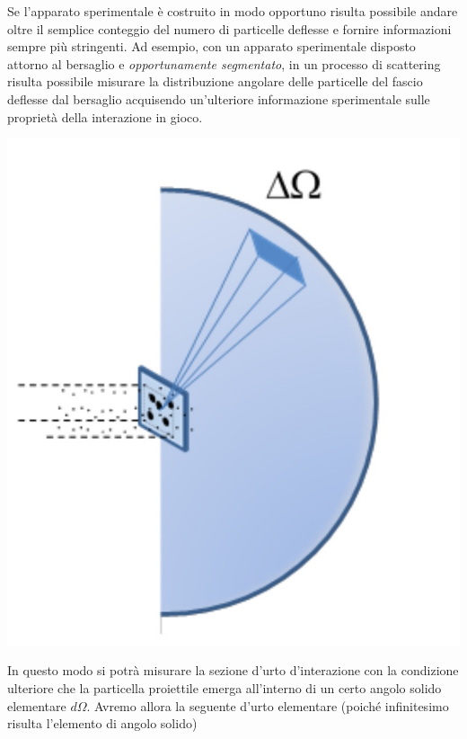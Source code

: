 Se l'apparato sperimentale è costruito in modo opportuno risulta
possibile andare oltre il semplice conteggio del numero di particelle
deflesse e fornire informazioni sempre più stringenti.
Ad esempio, con un apparato sperimentale disposto attorno al bersaglio e
\emph{opportunamente segmentato}, in un processo di scattering risulta
possibile misurare la distribuzione angolare delle particelle del fascio
deflesse dal bersaglio acquisendo un'ulteriore informazione sperimentale
sulle proprietà della interazione in gioco.
\begin{marginfigure}
	\includegraphics{figs/solid-angle-cross-section}
	\label{fig:solid-angle-cross-section}
\end{marginfigure}
In questo modo si potrà misurare la sezione d'urto d'interazione con la condizione ulteriore che
la particella proiettile emerga all'interno di un certo angolo solido
elementare \(d \Omega\).
Avremo allora la seguente d'urto elementare
(poiché infinitesimo risulta l'elemento di angolo solido)

